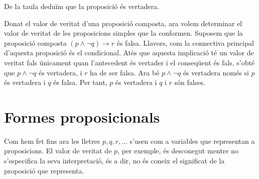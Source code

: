 De la taula deduïm que la proposició és vertadera.

\bigskip

Donat el valor de veritat d'una proposició composta, ara volem
determinar el valor de veritat de les proposicions simples que la conformen.
Suposem que la proposició composta $\left( p\wedge\lnot q\right)
\longrightarrow r$ és falsa. Llavors, com la connectiva principal
d'aquesta proposició és el condicional. Atès que aquesta
implicació té un valor de veritat fals únicament quan
l'antecedent és vertader i el conseqüent és fals, s'obté que
$p\wedge\lnot q$ és vertadera, i $r$ ha de ser falsa. Ara bé $p\wedge\lnot q$ és vertadera només si $p$ és vertadera i $q$
és falsa. Per tant, $p$ és vertadera i $q$ i $r$ són falses.

\section{Formes proposicionals}

Com hem fet fins ara les lletres $p,q,r,...$ s'usen com a variables que
representan a proposicions. El valor de veritat de $p$, per exemple, és
desconegut mentre no s'especifica la seva interpretació, és a dir,
no és coneix el significat de la proposició que representa.

